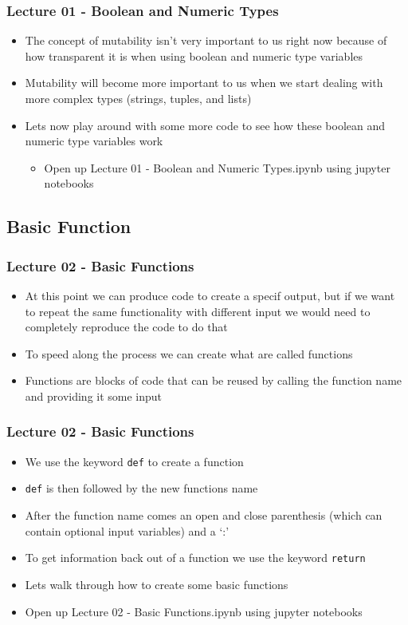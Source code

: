 \documentclass[mini frame in current subsection]{beamer}
\begin{document}
		\begin{frame}
			\frametitle{Lecture 01 - Boolean and Numeric Types}
			\begin{itemize}
				\vfill\item  The concept of mutability isn't very important to us right now because of how transparent it is when using boolean and numeric type variables
				\vfill\item  Mutability will become more important to us when we start dealing with more complex types (strings, tuples, and lists)
				\vfill\item  Lets now play around with some more code to see how these boolean and numeric type variables work
					\begin{itemize}
						\item  Open up Lecture 01 - Boolean and Numeric Types.ipynb using jupyter notebooks
					\end{itemize}
			\end{itemize}
		\end{frame}
		
	\subsection{Basic Function}
	
		\begin{frame}
			\frametitle{Lecture 02 - Basic Functions}
			\begin{itemize}
				\vfill\item  At this point we can produce code to create a specif output, but if we want to repeat the same functionality with different input we would need to completely reproduce the code to do that
				\vfill\item  To speed along the process we can create what are called functions
				\vfill\item  Functions are blocks of code that can be reused by calling the function name and providing it some input
			\end{itemize}
		\end{frame}
	
		\begin{frame}
			\frametitle{Lecture 02 - Basic Functions}
			\begin{itemize}
				\vfill\item  We use the keyword \texttt{def} to create a function
				\vfill\item  \texttt{def}  is then followed by the new functions name
				\vfill\item  After the function name comes an open and close parenthesis (which can contain optional input variables) and a `:'
				\vfill\item  To get information back out of a function we use the keyword \texttt{return}
				\vfill\item  Lets walk through how to create some basic functions
				\vfill\item  Open up Lecture 02 - Basic Functions.ipynb using jupyter notebooks
			\end{itemize}
		\end{frame}
		
\end{document}
